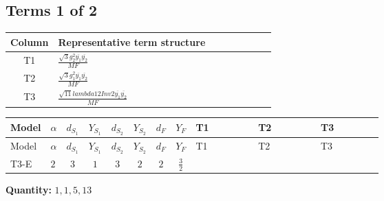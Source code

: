 \documentclass[8pt]{article}
\begin{document}
\begin{landscape}
\subsection*{Terms 1 of 2}
\begin{center}
\begin{tabular}{@{}c >{\raggedright\arraybackslash}p{0.82\linewidth}@{}}
\toprule
Column & Representative term structure \\
\midrule
T1 & \(\displaystyle \frac{\sqrt{3} g_{2}^{2} \overline{y_{1}} \overline{y_{2}}}{MF}\) \\
\midrule
T2 & \(\displaystyle \frac{\sqrt{3} g_{1}^{2} \overline{y_{1}} \overline{y_{2}}}{MF}\) \\
\midrule
T3 & \(\displaystyle \frac{\sqrt{11} lambda12Inv2 \overline{y_{1}} \overline{y_{2}}}{MF}\) \\
\midrule
\bottomrule
\end{tabular}
\end{center}
\smallskip
\tiny
\begin{longtable}{@{}llcccccc >{\raggedright\arraybackslash}p{0.21\linewidth} >{\raggedright\arraybackslash}p{0.21\linewidth} >{\raggedright\arraybackslash}p{0.21\linewidth}@{}}
\toprule
Model & $\alpha$ & $d_{S_1}$ & $Y_{S_1}$ & $d_{S_2}$ & $Y_{S_2}$ & $d_F$ & $Y_F$ & T1 & T2 & T3 \\
\midrule
\endfirsthead
\toprule
Model & $\alpha$ & $d_{S_1}$ & $Y_{S_1}$ & $d_{S_2}$ & $Y_{S_2}$ & $d_F$ & $Y_F$ & T1 & T2 & T3 \\
\midrule
\endhead
T3-E & $2$ & $3$ & $1$ & $3$ & $2$ & $2$ & $\frac{3}{2}$ & \scriptsize\adjustbox{max width=\linewidth}{$\begin{gathered} - \frac{11 \sqrt{3} g_{2}^{2} \overline{y_{1}} \overline{y_{2}}}{8 MF}\end{gathered}$} & \scriptsize\adjustbox{max width=\linewidth}{$\begin{gathered} - \frac{9 \sqrt{3} g_{1}^{2} \overline{y_{1}} \overline{y_{2}}}{8 MF}\end{gathered}$} & \scriptsize\adjustbox{max width=\linewidth}{$\begin{gathered} - \frac{3 \sqrt{11} lambda12Inv2 \overline{y_{1}} \overline{y_{2}}}{22 MF}\end{gathered}$} \\
\midrule
\bottomrule
\end{longtable}
\clearpage
\noindent\textbf{Quantity: }$\mathrm{1,1,5,13}$\par\smallskip

\end{landscape}
\end{document}
